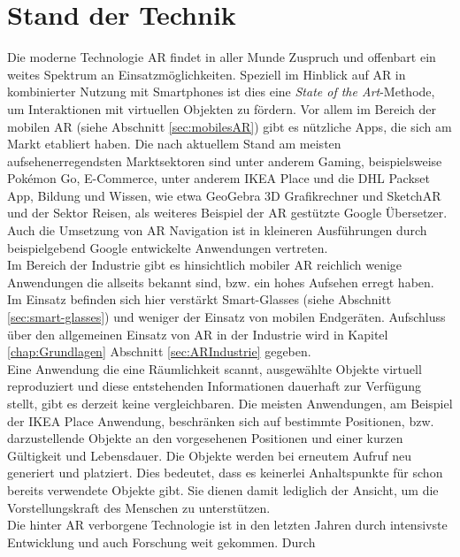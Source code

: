 \section{Stand der Technik}
\label{chap:Stand der Technik}
Die moderne Technologie \acl{AR} findet in aller Munde Zuspruch und offenbart ein weites Spektrum an Einsatzmöglichkeiten. 
Speziell im Hinblick auf \acl{AR} in kombinierter Nutzung mit Smartphones ist dies eine \textit{State of the Art}-Methode, 
um Interaktionen mit virtuellen Objekten zu fördern. Vor allem im Bereich der mobilen \acs{AR} (siehe Abschnitt \ref{sec:mobilesAR}) 
gibt es nützliche Apps, die sich am Markt etabliert haben. Die nach aktuellem Stand am meisten aufsehenerregendsten Marktsektoren sind unter anderem 
Gaming, beispielsweise Pokémon Go, E-Commerce, unter anderem IKEA Place und die DHL Packset App, Bildung und Wissen, wie etwa GeoGebra 3D 
Grafikrechner und SketchAR und der Sektor Reisen, als weiteres Beispiel der \acs{AR} gestützte Google Übersetzer. Auch die Umsetzung von \acl{AR} 
Navigation ist in kleineren Ausführungen durch beispielgebend Google entwickelte Anwendungen vertreten. %
\\ 
Im Bereich der Industrie gibt es hinsichtlich mobiler \acs{AR} 
reichlich wenige Anwendungen die allseits bekannt sind, bzw. ein hohes Aufsehen erregt haben. Im Einsatz befinden sich hier verstärkt Smart-Glasses (siehe Abschnitt 
\ref{sec:smart-glasses}) und weniger der Einsatz von mobilen Endgeräten. Aufschluss über den allgemeinen Einsatz von \acs{AR} in der Industrie wird in Kapitel 
\ref{chap:Grundlagen} Abschnitt \ref{sec:ARIndustrie} gegeben. 
\\ 
\linebreak
Eine Anwendung die eine Räumlichkeit scannt, ausgewählte Objekte virtuell reproduziert und diese entstehenden Informationen dauerhaft zur 
Verfügung stellt, gibt es derzeit keine vergleichbaren. Die meisten Anwendungen, am Beispiel der IKEA Place Anwendung, beschränken sich 
auf bestimmte Positionen, bzw. darzustellende Objekte an den vorgesehenen Positionen und einer kurzen Gültigkeit und Lebensdauer. 
Die Objekte werden bei erneutem Aufruf neu generiert und platziert. Dies bedeutet, 
dass es keinerlei Anhaltspunkte für schon bereits verwendete Objekte gibt. Sie dienen damit lediglich der Ansicht, um die 
Vorstellungskraft des Menschen zu unterstützen. 
\\ 
\linebreak
Die hinter \acs{AR} verborgene Technologie ist in den letzten Jahren durch intensivste Entwicklung und auch Forschung weit gekommen. Durch 
